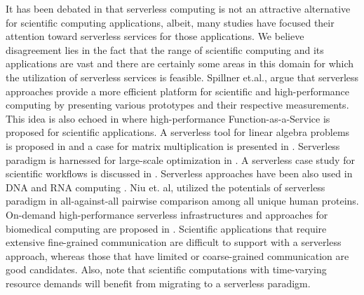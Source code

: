 It has been debated in  that serverless computing is not an attractive alternative for scientific computing applications, albeit, many studies have focused their attention toward serverless services for those applications. We believe disagreement lies in the fact that the range of scientific computing and its applications are vast and there are certainly some areas in this domain for which the utilization of serverless services is feasible. 
Spillner et.al.,  argue that serverless approaches provide a more efficient platform for scientific and high-performance computing by presenting various prototypes and their respective measurements. This idea is also echoed in  where high-performance Function-as-a-Service is proposed for scientific applications. A serverless tool for linear algebra problems is proposed in  and a case for matrix multiplication is presented in . Serverless paradigm is harnessed for large-scale optimization in . A serverless case study for scientific workflows is discussed in . 
Serverless approaches have been also used in DNA and RNA computing . Niu et. al,  utilized the potentials of serverless paradigm in all-against-all pairwise comparison among all unique human proteins. On-demand high-performance serverless infrastructures and approaches for biomedical computing are proposed in .
Scientific applications that require extensive fine-grained communication are difficult to support with a serverless approach, whereas those that have limited or coarse-grained communication are good candidates. Also, note that scientific computations with time-varying resource demands will benefit from migrating to a serverless paradigm.

